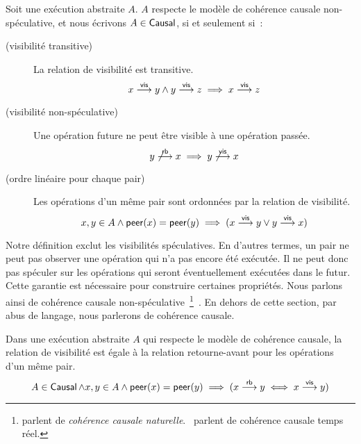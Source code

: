 \begin{definition}\label{def:causal-consistency}
  Soit une exécution abstraite $A$. $A$ respecte le modèle de cohérence causale non-spéculative, et nous écrivons $A \in \operatorname{\mathsf{Causal}}$, si et seulement si~:

  \begin{description}
  \item[ (visibilité transitive)]
  La relation de visibilité est transitive.
  \begin{equation*}
    x \overset{\mathsf{vis}}{\longrightarrow} y \land y \overset{\mathsf{vis}}{\longrightarrow} z \implies x \overset{\mathsf{vis}}{\longrightarrow} z
  \end{equation*}

  \item[ (visibilité non-spéculative)]
  Une opération future ne peut être visible à une opération passée.
  \begin{equation*}
    y \not\overset{\mathsf{rb}}{\longrightarrow} x \implies y \not\overset{\mathsf{vis}}{\longrightarrow} x
  \end{equation*}

  \item[ (ordre linéaire pour chaque pair)]
  Les opérations d'un même pair sont ordonnées par la relation de visibilité.
  \begin{equation*}
    x, y \in A \land \operatorname{\mathsf{peer}}(x) = \operatorname{\mathsf{peer}}(y) \implies
    (x \overset{\mathsf{vis}}{\longrightarrow} y \lor y \overset{\mathsf{vis}}{\longrightarrow} x)
  \end{equation*}
  \end{description}
\end{definition}

Notre définition exclut les visibilités spéculatives.
En d'autres termes, un pair ne peut pas observer une opération qui n'a pas encore été exécutée.
Il ne peut donc pas spéculer sur les opérations qui seront éventuellement exécutées dans le futur.
Cette garantie est nécessaire pour construire certaines propriétés.
Nous parlons ainsi de cohérence causale non-spéculative~\footnote{\textcite{mahajan_2011_cac} parlent de \emph{cohérence causale naturelle}.~\textcite{viotti_consistency_2016} parlent de cohérence causale temps réel.}~\autocite{mahajan_2011_cac,viotti_consistency_2016}.
En dehors de cette section, par abus de langage, nous parlerons de cohérence causale.

\begin{proposition}\label{th:rb-vis}
Dans une exécution abstraite $A$ qui respecte le modèle de cohérence causale, la relation de visibilité est égale à la relation retourne-avant pour les opérations d'un même pair.
\begin{equation*}
    A \in \operatorname{\mathsf{Causal}} \land x, y \in A \land \operatorname{\mathsf{peer}}(x) = \operatorname{\mathsf{peer}}(y) \implies (x \overset{\mathsf{rb}}{\longrightarrow} y \iff x \overset{\mathsf{vis}}{\longrightarrow} y)
\end{equation*}
\end{proposition}

